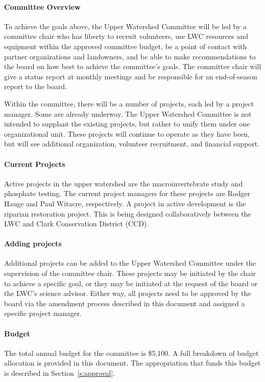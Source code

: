 \documentclass[letterpaper,11pt,leqno]{article}
\begin{document}
\paragraph{Committee Overview} To achieve the goals above, the Upper Watershed Committee will be led by a committee chair
who has liberty to recruit volunteers, use LWC resources and equipment within the approved committee budget, be a point of contact with partner organizations and landowners,
and be able to make recommendations to the board on how best to achieve the committee's goals. The committee chair will give a status report at monthly meetings and be responsible for an
end-of-season report to the board.

Within the committee, there will be a number of projects, each led by a project manager. Some are already underway. The Upper Watershed Committee is not intended to supplant the existing projects, but rather to unify them under one organizational unit. These projects will continue to operate as they have been, but will see additional organization, volunteer recruitment, and financial support.

\paragraph{Current Projects} Active projects in the upper watershed are the macroinvertebrate study and phosphate testing. The current project managers for these projects are
Rodger Hauge and Paul Witacre, respectively. A project in active development is the riparian restoration project. This is being designed collaboratively between the LWC and Clark Conservation District (CCD).

\paragraph{Adding projects} Additional projects can be added to the Upper Watershed Committee under the supervision of the committee chair. These projects may be initiated by the chair
to achieve a specific goal, or they may be initiated at the request of the board or the LWC's science advisor. Either way, all projects need to be approved by the board via the amendment process described in this document and assigned a specific project manager.

\paragraph{Budget} The total annual budget for the committee is \$5,100. A full breakdown of budget allocation is provided in this document. The appropriation that funds this budget is described in Section~\ref{s:approval}.
\end{document}
